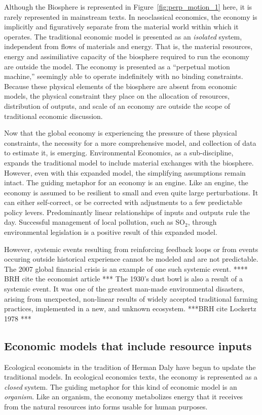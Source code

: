 Although the Biosphere is represented in
Figure~\ref{fig:perp_motion_1} 
here, it is rarely represented in mainstream texts. 
In neoclassical economics, 
the economy is implicitly and figuratively separate from the material world within which it operates.
The traditional economic model is presented as an \emph{isolated} system, 
independent from flows of materials and energy.
That is, the material resources, energy
and assimiliative capacity of the biosphere required to run the economy are outside the model.
The economy is presented as a ``perpetual motion machine,'' seemingly able to %
operate indefinitely with no binding constraints.
Because these physical elements of the biosphere are absent from economic models,
the physical constraint they place on the allocation of resources, distribution of outputs, and 
scale of an economy are outside the scope of traditional economic discussion.

Now that the global economy is experiencing the pressure of these physical constraints, 
the necessity for a more comprehensive model, and collection of data to estimate it,
is emerging. Environmental Economics, as a sub-discipline, expands the traditional model to include material exchanges with the biosphere. 
However, even with this expanded model, the simplifying assumptions remain intact. The guiding metaphor for 
an economy is an engine. Like an engine, the economy is  assumed 
to be resilient to small and even quite large perturbations.  It can either self-correct, or be corrected with adjustments to
a few predictable policy levers. Predominantly linear relationships of inputs and outputs rule the day. 
Successful management of  local pollution, such as SO$_2$, through environmental legislation
is a positive result of this expanded model.
 

However, systemic events resulting from reinforcing feedback loops or from events occuring
outside historical experience cannot be modeled and are not predictable. The 2007 global 
financial crisis is an example of one such systemic event. **** BRH cite the economist article ***
The 1930's dust bowl is also a result of a systemic event. It was one of the greatest man-made
environmental disasters, arising from unexpected, non-linear 
results of widely accepted traditional farming practices, 
implemented in a new, and unknown ecosystem. ***BRH cite Lockertz 1978 ***


\subsection{Economic models that include resource inputs}
Ecological economists in the tradition of Herman Daly have begun to 
update the traditional models. In ecological economics texts, the economy is 
represented as a \emph{closed} system. The guiding metaphor for this kind of economic model is an \emph{organism}. Like an organism,
the economy metabolizes energy that it receives from the natural resources
 into forms usable for human purposes.
   

